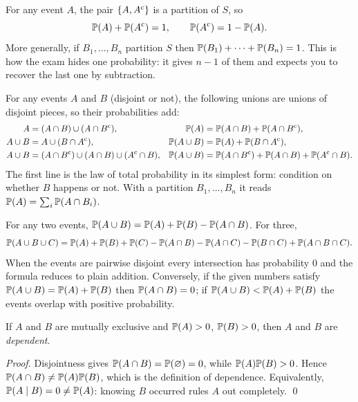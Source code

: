\begin{keyfact}
For any event $A$, the pair $\{A, A^{\mathrm{c}}\}$ is a partition of $S$, so
\[
\mathbb{P}(A) + \mathbb{P}(A^{\mathrm{c}}) = 1, \qquad \mathbb{P}(A^{\mathrm{c}}) = 1 - \mathbb{P}(A).
\]
More generally, if $B_1, \dots, B_n$ partition $S$ then
$\mathbb{P}(B_1) + \dots + \mathbb{P}(B_n) = 1$. This is how the exam hides one probability: it gives
$n-1$ of them and expects you to recover the last one by subtraction.
\end{keyfact}

\begin{keyfact}
For any events $A$ and $B$ (disjoint or not), the following unions are unions of disjoint
pieces, so their probabilities add:
\begin{align*}
A &= (A \cap B) \cup (A \cap B^{\mathrm{c}}),
 & \mathbb{P}(A) &= \mathbb{P}(A \cap B) + \mathbb{P}(A \cap B^{\mathrm{c}}), \\
A \cup B &= A \cup (B \cap A^{\mathrm{c}}),
 & \mathbb{P}(A \cup B) &= \mathbb{P}(A) + \mathbb{P}(B \cap A^{\mathrm{c}}), \\
A \cup B &= (A \cap B^{\mathrm{c}}) \cup (A \cap B) \cup (A^{\mathrm{c}} \cap B),
 & \mathbb{P}(A \cup B) &= \mathbb{P}(A \cap B^{\mathrm{c}}) + \mathbb{P}(A \cap B) + \mathbb{P}(A^{\mathrm{c}} \cap B).
\end{align*}
The first line is the law of total probability in its simplest form: condition on whether
$B$ happens or not. With a partition $B_1, \dots, B_n$ it reads
$\mathbb{P}(A) = \sum_{i} \mathbb{P}(A \cap B_i)$.
\end{keyfact}

\begin{keyfact}
For any two events, $\mathbb{P}(A \cup B) = \mathbb{P}(A) + \mathbb{P}(B) - \mathbb{P}(A \cap B)$. For three,
\[
\mathbb{P}(A \cup B \cup C) = \mathbb{P}(A) + \mathbb{P}(B) + \mathbb{P}(C)
 - \mathbb{P}(A \cap B) - \mathbb{P}(A \cap C) - \mathbb{P}(B \cap C) + \mathbb{P}(A \cap B \cap C).
\]
When the events are pairwise disjoint every intersection has probability $0$ and the
formula reduces to plain addition. Conversely, if the given numbers satisfy
$\mathbb{P}(A \cup B) = \mathbb{P}(A) + \mathbb{P}(B)$ then $\mathbb{P}(A \cap B) = 0$; if
$\mathbb{P}(A \cup B) < \mathbb{P}(A) + \mathbb{P}(B)$ the events overlap with positive probability.
\end{keyfact}

\begin{keyfact}
If $A$ and $B$ are mutually exclusive and $\mathbb{P}(A) > 0$, $\mathbb{P}(B) > 0$, then $A$ and $B$
are \emph{dependent}.

\emph{Proof.} Disjointness gives $\mathbb{P}(A \cap B) = \mathbb{P}(\varnothing) = 0$, while
$\mathbb{P}(A)\mathbb{P}(B) > 0$. Hence $\mathbb{P}(A \cap B) \neq \mathbb{P}(A)\mathbb{P}(B)$, which is the
definition of dependence. Equivalently, $\mathbb{P}(A \mid B) = 0 \neq \mathbb{P}(A)$: knowing $B$
occurred rules $A$ out completely. \qed
\end{keyfact}

